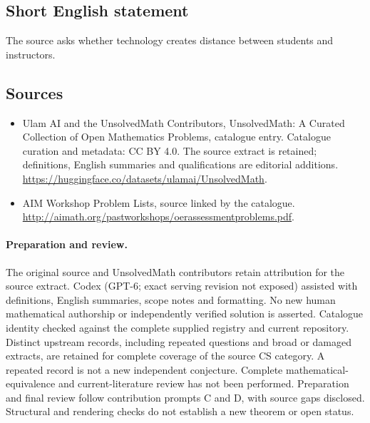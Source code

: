 \documentclass[11pt]{article}
\begin{document}
\subsection{Short English statement}
The source asks whether technology creates distance between students and instructors.
\subsection{Sources}
\begin{itemize}
\item[\hypertarget{source:statement:1}{S1}] Ulam AI and the UnsolvedMath Contributors, UnsolvedMath: A Curated Collection of Open Mathematics Problems, catalogue entry. Catalogue curation and metadata: CC BY 4.0. The source extract is retained; definitions, English summaries and qualifications are editorial additions.
\url{https://huggingface.co/datasets/ulamai/UnsolvedMath}.
\item[\hypertarget{source:statement:2}{S2}] AIM Workshop Problem Lists, source linked by the catalogue.
\url{http://aimath.org/pastworkshops/oerassessmentproblems.pdf}.
\end{itemize}
\paragraph{Preparation and review.}
The original source and UnsolvedMath contributors retain attribution for the source extract. Codex (GPT-6; exact serving revision not exposed) assisted with definitions, English summaries, scope notes and formatting. No new human mathematical authorship or independently verified solution is asserted. Catalogue identity checked against the complete supplied registry and current repository. Distinct upstream records, including repeated questions and broad or damaged extracts, are retained for complete coverage of the source CS category. A repeated record is not a new independent conjecture. Complete mathematical-equivalence and current-literature review has not been performed. Preparation and final review follow contribution prompts C and D, with source gaps disclosed. Structural and rendering checks do not establish a new theorem or open status.
\label{end:statement}
\end{document}
